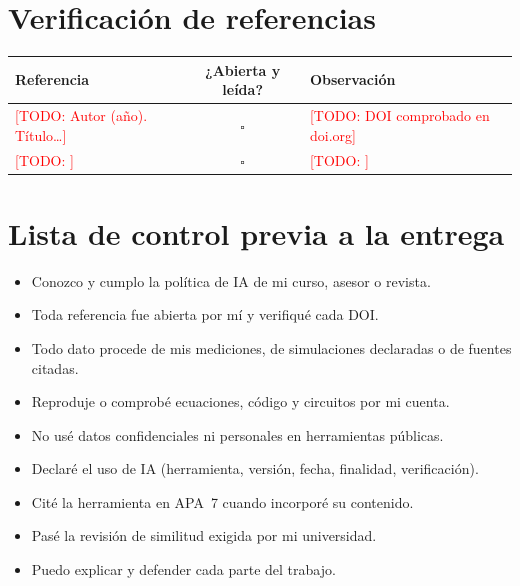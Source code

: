 \documentclass[12pt,a4paper]{article}
\newcommand{\todo}[1]{\textcolor{red}{[TODO: #1]}}
\begin{document}
\section{Verificación de referencias}
\begin{tabular}{p{7cm}cp{4.5cm}}
  \toprule
  Referencia & ¿Abierta y leída? & Observación \\
  \midrule
  \todo{Autor (año). Título…} & $\square$ & \todo{DOI comprobado en doi.org} \\
  \todo{} & $\square$ & \todo{} \\
  \bottomrule
\end{tabular}

\section{Lista de control previa a la entrega}
\begin{itemize}[label=$\square$]
  \item Conozco y cumplo la política de IA de mi curso, asesor o revista.
  \item Toda referencia fue abierta por mí y verifiqué cada DOI.
  \item Todo dato procede de mis mediciones, de simulaciones declaradas o de fuentes citadas.
  \item Reproduje o comprobé ecuaciones, código y circuitos por mi cuenta.
  \item No usé datos confidenciales ni personales en herramientas públicas.
  \item Declaré el uso de IA (herramienta, versión, fecha, finalidad, verificación).
  \item Cité la herramienta en APA~7 cuando incorporé su contenido.
  \item Pasé la revisión de similitud exigida por mi universidad.
  \item Puedo explicar y defender cada parte del trabajo.
\end{itemize}
\end{document}
